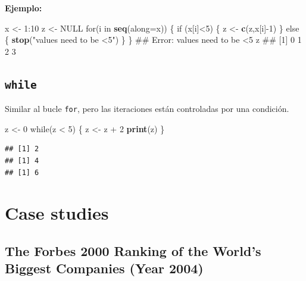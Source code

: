 \documentclass[]{article}
\newenvironment{Shaded}{\begin{snugshade}}{\end{snugshade}}
\newcommand{\KeywordTok}[1]{\textcolor[rgb]{0.13,0.29,0.53}{\textbf{{#1}}}}
\newcommand{\DataTypeTok}[1]{\textcolor[rgb]{0.13,0.29,0.53}{{#1}}}
\newcommand{\DecValTok}[1]{\textcolor[rgb]{0.00,0.00,0.81}{{#1}}}
\newcommand{\StringTok}[1]{\textcolor[rgb]{0.31,0.60,0.02}{{#1}}}
\newcommand{\OtherTok}[1]{\textcolor[rgb]{0.56,0.35,0.01}{{#1}}}
\newcommand{\NormalTok}[1]{{#1}}
\numberwithin{equation}{section}
\begin{document}
\textbf{Ejemplo:}

\begin{Shaded}
\begin{Highlighting}[]
\NormalTok{x <-}\StringTok{ }\DecValTok{1}\NormalTok{:}\DecValTok{10}
\NormalTok{z <-}\StringTok{ }\OtherTok{NULL}
\NormalTok{for(i in }\KeywordTok{seq}\NormalTok{(}\DataTypeTok{along=}\NormalTok{x)) \{}
    \NormalTok{if (x[i]<}\DecValTok{5}\NormalTok{) \{}
        \NormalTok{z <-}\StringTok{ }\KeywordTok{c}\NormalTok{(z,x[i]-}\DecValTok{1}\NormalTok{) }
    \NormalTok{\} else \{}
        \KeywordTok{stop}\NormalTok{(}\StringTok{"values need to be <5"}\NormalTok{)}
    \NormalTok{\}}
\NormalTok{\}}
\NormalTok{## Error: values need to be <5}
\NormalTok{z}
\NormalTok{## [1] 0 1 2 3}
\end{Highlighting}
\end{Shaded}

\subsection{\texorpdfstring{\texttt{while}}{while}}\label{while-1}

Similar al bucle \texttt{for}, pero las iteraciones están controladas
por una condición.

\begin{Shaded}
\begin{Highlighting}[]
\NormalTok{z <-}\StringTok{ }\DecValTok{0}
\NormalTok{while(z <}\StringTok{ }\DecValTok{5}\NormalTok{) \{}
    \NormalTok{z <-}\StringTok{ }\NormalTok{z +}\StringTok{ }\DecValTok{2}
    \KeywordTok{print}\NormalTok{(z) }
\NormalTok{\}}
\end{Highlighting}
\end{Shaded}

\begin{verbatim}
## [1] 2
## [1] 4
## [1] 6
\end{verbatim}

\section{Case studies}\label{case-studies}

\subsection{The Forbes 2000 Ranking of the World's Biggest Companies
(Year
2004)}\label{the-forbes-2000-ranking-of-the-worlds-biggest-companies-year-2004}
\end{document}
